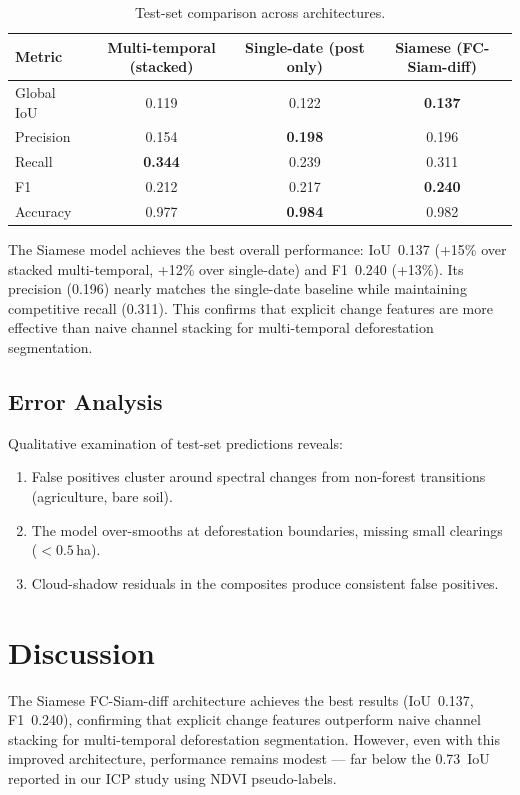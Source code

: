 \documentclass[twocolumn]{article}
\begin{document}
\begin{table}[ht]
\centering
\caption{Test-set comparison across architectures.}
\label{tab:test_comparison}
\begin{tabular}{lccc}
\toprule
Metric & Multi-temporal (stacked) & Single-date (post only) & Siamese (FC-Siam-diff) \\
\midrule
Global IoU   & 0.119 & 0.122 & \textbf{0.137} \\
Precision    & 0.154 & \textbf{0.198} & 0.196 \\
Recall       & \textbf{0.344} & 0.239 & 0.311 \\
F1           & 0.212 & 0.217 & \textbf{0.240} \\
Accuracy     & 0.977 & \textbf{0.984} & 0.982 \\
\bottomrule
\end{tabular}
\end{table}

The Siamese model achieves the best overall performance: IoU~0.137 
(+15\% over stacked multi-temporal, +12\% over single-date) and 
F1~0.240 (+13\%).  Its precision (0.196) nearly matches the 
single-date baseline while maintaining competitive recall (0.311).  
This confirms that explicit change features are more effective than 
naive channel stacking for multi-temporal deforestation segmentation.

\subsection{Error Analysis}
Qualitative examination of test-set predictions reveals:
\begin{enumerate}
    \item False positives cluster around spectral changes from 
          non-forest transitions (agriculture, bare soil).
    \item The model over-smooths at deforestation boundaries, 
          missing small clearings ($<0.5$\,ha).
    \item Cloud-shadow residuals in the composites produce 
          consistent false positives.
\end{enumerate}

\section{Discussion}
The Siamese FC-Siam-diff architecture achieves the best results 
(IoU~0.137, F1~0.240), confirming that explicit change features 
outperform naive channel stacking for multi-temporal deforestation 
segmentation.  However, even with this improved architecture, 
performance remains modest --- far below the 0.73~IoU reported 
in our ICP study using NDVI pseudo-labels.
\end{document}
